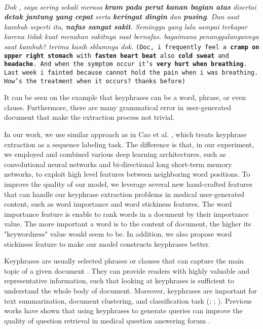 	\textit{\\Dok , saya sering sekali merasa \textbf{\emph{kram pada perut kanan bagian atas}} disertai \textbf{detak jantung yang cepat} serta \textbf{keringat dingin} dan \textbf{pusing}. Dan saat kambuh seperti itu, \textbf{nafas sangat sakit}. Seminggu yang lalu sampai terkapar karena tidak kuat menahan sakitnya saat bernafas. bagaimana penanggulangannya saat kambuh? terima kasih sblumnya dok.}
	\texttt{(Doc, i frequently feel a \textbf{cramp on upper right stomach} with \textbf{fasten heart beat} also \textbf{cold sweat} and \textbf{headache}. And when the symptom occur it's \textbf{very hurt when breathing}. Last week i fainted because cannot hold the pain when i was breathing. How's the treatment when it occurs? thanks before)}

It can be seen on the example that keyphrases can be a word, phrase, or even clause. Furthermore, there are many grammatical error in user-generated document that make the extraction process not trivial.

In our work, we use similar approach as in Cao et al. \cite{cao2010automatically}, which treats keyphrase extraction as a sequence labeling task. The difference is that, in our experiment, we employed and combined various deep learning architectures, such as convolutional neural networks and bi-directional long short-term memory networks, to exploit high level features between neighboring word positions. To improve the quality of our model, we leverage several new hand-crafted features that can handle our keyphrase extraction problems in medical user-generated content, such as word importance and word stickiness features. The word importance feature is enable to rank words in a document by their importance value. The more important a word is to the content of document, the higher its "keywordness" value would seem to be. In addition, we also propose word stickiness feature to make our model constructs keyphrases better. 

\iffalse
Keyphrases are usually selected phrases or clauses that can capture the main topic of a given document \cite{turney2000learning}. They can provide readers with highly valuable and representative information, such that looking at keyphrases is sufficient to understand the whole body of document. Moreover, keyphrases are important for text summarization, document clustering, and classification task (\cite{classDocumentEkp1}; \cite{qaEkp}; \cite{gong2009improving}). Previous works have shown that using keyphrases to generate queries can improve the quality of question retrieval in medical question answering forum \cite{cao2010automatically}.


